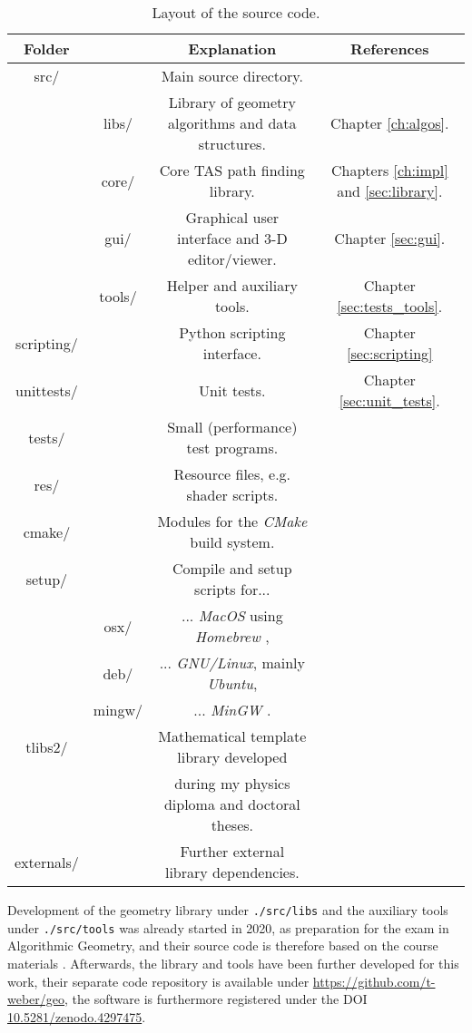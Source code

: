 \begin{table}[htb]
	\centering
	\begin{tabular}{|c c|c|c|}
		\hline
		\bf{Folder} & & \bf{Explanation} & \bf{References} \tabularnewline
		\hline
		src/ & & Main source directory. & \tabularnewline
		       & libs/ & Library of geometry algorithms and data structures. & Chapter \ref{ch:algos}. \tabularnewline
		       & core/ & Core TAS path finding library. & Chapters \ref{ch:impl} and \ref{sec:library}. \tabularnewline
		       & gui/ & Graphical user interface and 3-D editor/viewer. & Chapter \ref{sec:gui}. \tabularnewline
		       & tools/ & Helper and auxiliary tools. & Chapter \ref{sec:tests_tools}. \tabularnewline
		\hline
		scripting/ & & Python scripting interface. & Chapter \ref{sec:scripting} \tabularnewline
		\hline
		unittests/ & & Unit tests. & Chapter \ref{sec:unit_tests}. \tabularnewline
		\hline
		tests/ & & Small (performance) test programs. & \tabularnewline
		\hline
		res/ & & Resource files, e.g. shader scripts. & \tabularnewline
		\hline
		cmake/ & & Modules for the \textit{CMake} \cite{Martin2007, web_cmake} build system. & \tabularnewline
		\hline
		setup/ & & Compile and setup scripts for... & \tabularnewline
		           & osx/ & ... \textit{MacOS} using \textit{Homebrew} \cite{web_homebrew}, & \tabularnewline
		           & deb/ & ... \textit{GNU/Linux}, mainly \textit{Ubuntu}, & \tabularnewline
		           & mingw/ & ... \textit{MinGW} \cite{web_mingw64}. & \tabularnewline
		\hline
		tlibs2/ & & Mathematical template library developed  & \cite{Takin2016, Takin2017, Takin2021, DiplomaWeber, PhDWeber} \tabularnewline
		           & & during my physics diploma and doctoral theses. & \tabularnewline
		\hline
		externals/ & & Further external library dependencies. & \tabularnewline
		\hline
	\end{tabular}
	\caption[Source code layout.]{Layout of the source code.}
	\label{tab:sourcelayout}
\end{table}

Development of the geometry library under \lstinline|./src/libs| and the auxiliary tools under \lstinline|./src/tools| 
was already started in 2020, as preparation for the exam in Algorithmic Geometry, and their source code 
is therefore based on the course materials \cite{FUH_geo2020}. 
Afterwards, the library and tools have been further developed for this work, their separate code repository is available under 
\url{https://github.com/t-weber/geo}, the software is furthermore registered under the DOI 
\href{https://doi.org/10.5281/zenodo.4297475}{10.5281/zenodo.4297475}.

